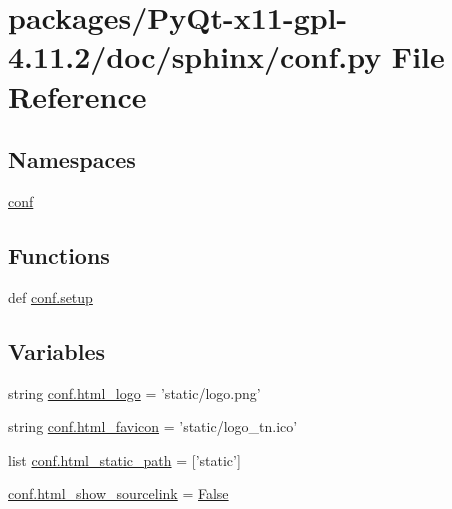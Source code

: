 \hypertarget{PyQt-x11-gpl-4_811_82_2doc_2sphinx_2conf_8py}{}\section{packages/\+Py\+Qt-\/x11-\/gpl-\/4.11.2/doc/sphinx/conf.py File Reference}
\label{PyQt-x11-gpl-4_811_82_2doc_2sphinx_2conf_8py}
\subsection*{Namespaces}
\begin{DoxyCompactItemize}
\item 
 \hyperlink{namespaceconf}{conf}
\end{DoxyCompactItemize}
\subsection*{Functions}
\begin{DoxyCompactItemize}
\item 
def \hyperlink{namespaceconf_a504e29527d5ed4b694637a2536315abf}{conf.\+setup}
\end{DoxyCompactItemize}
\subsection*{Variables}
\begin{DoxyCompactItemize}
\item 
string \hyperlink{namespaceconf_a5c9fb4f5f81fbe64d03716f0dd7ff3cb}{conf.\+html\+\_\+logo} = 'static/logo.\+png'
\item 
string \hyperlink{namespaceconf_ac2a0566788a90720ba8d852f67eeda76}{conf.\+html\+\_\+favicon} = 'static/logo\+\_\+tn.\+ico'
\item 
list \hyperlink{namespaceconf_acb91fefcfd3aa6f3529fa682ab834832}{conf.\+html\+\_\+static\+\_\+path} = \mbox{[}'static'\mbox{]}
\item 
\hyperlink{namespaceconf_addae8074fd85797596fa005bfa0a51a6}{conf.\+html\+\_\+show\+\_\+sourcelink} = \hyperlink{libqhull_8h_a306ebd41c0cd1303b1372c6153f0caf8}{False}
\end{DoxyCompactItemize}
